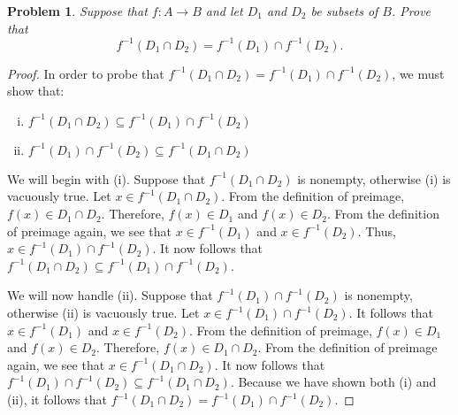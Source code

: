 \documentclass{article}
\newtheorem{problem}{Problem}
\begin{document}
\begin{problem}Suppose that $f:A \rightarrow B$ and let $D_1$ and $D_2$ be subsets of $B$. Prove that 
$$ f^{-1}\left(D_1 \cap D_2 \right) = f^{-1}\left(D_1\right) \cap f^{-1}\left(D_2\right). $$\end{problem}

\begin{proof}
In order to probe that $f^{-1}\left(D_1 \cap D_2 \right) = f^{-1}\left(D_1\right) \cap f^{-1}\left(D_2\right)$, we must show that:
\begin{enumerate}[(i)]
    \item $f^{-1}\left(D_1 \cap D_2 \right) \subseteq f^{-1}\left(D_1\right) \cap f^{-1}\left(D_2\right)$
    \item $f^{-1}\left(D_1\right) \cap f^{-1}\left(D_2\right) \subseteq f^{-1}\left(D_1 \cap D_2 \right)$
\end{enumerate}

We will begin with (i). Suppose that $f^{-1}\left(D_1 \cap D_2 \right)$ is nonempty, otherwise (i) is vacuously true. Let $x \in f^{-1}\left(D_1 \cap D_2 \right)$. From the definition of preimage, $f(x) \in D_1 \cap D_2$. Therefore, $f(x) \in D_1$ and $f(x) \in D_2$. From the definition of preimage again, we see that $x \in f^{-1}(D_1)$ and $x \in f^{-1}(D_2)$. Thus, $x \in f^{-1}\left(D_1\right) \cap f^{-1}\left(D_2\right)$. It now follows that $f^{-1}\left(D_1 \cap D_2 \right) \subseteq f^{-1}\left(D_1\right) \cap f^{-1}\left(D_2\right)$.

We will now handle (ii). Suppose that $f^{-1}\left(D_1\right) \cap f^{-1}\left(D_2\right)$ is nonempty, otherwise (ii) is vacuously true. Let $x \in f^{-1}\left(D_1\right) \cap f^{-1}\left(D_2\right)$. It follows that $x \in f^{-1}(D_1)$ and $x \in f^{-1}(D_2)$. From the definition of preimage, $f(x) \in D_1$ and $f(x) \in D_2$. Therefore, $f(x) \in D_1 \cap D_2$. From the definition of preimage again, we see that $x \in f^{-1}\left(D_1 \cap D_2 \right)$. It now follows that $f^{-1}\left(D_1\right) \cap f^{-1}\left(D_2\right) \subseteq f^{-1}\left(D_1 \cap D_2 \right)$. Because we have shown both (i) and (ii), it follows that $f^{-1}\left(D_1 \cap D_2 \right) = f^{-1}\left(D_1\right) \cap f^{-1}\left(D_2\right)$.


\end{proof}
\end{document}
